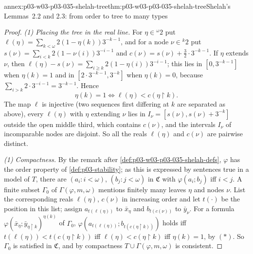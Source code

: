 \begin{annexitem}{annex:p03-w03-p03-035-shelah-tree}{thm:p03-w03-p03-035-shelah-tree}{Shelah's Lemmas~2.2 and 2.3: from order to tree to many types}
\begin{proof}
\emph{(1) Placing the tree in the real line.}  For \(\eta\in{}^{\omega}2\) put
\(\ell(\eta)=\sum_{k<\omega}2(1-\eta(k))3^{-k-1}\), and for a node
\(\nu\in{}^{k}2\) put \(s(\nu)=\sum_{i<k}2(1-\nu(i))3^{-i-1}\) and
\(c(\nu)=s(\nu)+\tfrac32\cdot3^{-k-1}\).  If \(\eta\) extends \(\nu\), then
\(\ell(\eta)-s(\nu)=\sum_{i\geq k}2(1-\eta(i))3^{-i-1}\); this lies in
\([0,3^{-k-1}]\) when \(\eta(k)=1\) and in \([2\cdot3^{-k-1},3^{-k}]\) when
\(\eta(k)=0\), because \(\sum_{i>k}2\cdot3^{-i-1}=3^{-k-1}\).  Hence
\[
  \eta(k)=1\iff\ell(\eta)<c(\eta\restriction k).\tag{\(*\)}
\]
The map \(\ell\) is injective (two sequences first differing at \(k\) are
separated as above), every \(\ell(\eta)\) with \(\eta\) extending \(\nu\) lies
in \(I_\nu=[s(\nu),s(\nu)+3^{-k}]\) outside the open middle third, which
contains \(c(\nu)\), and the intervals \(I_\nu\) of incomparable nodes are
disjoint.  So all the reals \(\ell(\eta)\) and \(c(\nu)\) are pairwise
distinct.

\emph{(1) Compactness.}  By the remark after
\cref{def:p03-w03-p03-035-shelah-defs}, \(\varphi\) has the order property of
\cref{def:p03-stability}; as this is expressed by sentences true in a model
of \(T\), there are \((a_i:i<\omega)\), \((b_j:j<\omega)\) in \(\mathfrak C\)
with \(\varphi(a_i;b_j)\) iff \(i<j\).  A finite subset \(\Gamma_0\) of
\(\Gamma(\varphi,m,\omega)\) mentions finitely many leaves \(\eta\) and nodes
\(\nu\).  List the corresponding reals \(\ell(\eta)\), \(c(\nu)\) in
increasing order and let \(t(\cdot)\) be the position in this list; assign
\(a_{t(\ell(\eta))}\) to \(\bar x_\eta\) and \(b_{t(c(\nu))}\) to
\(\bar y_\nu\).  For a formula
\(\varphi(\bar x_\eta;\bar y_{\eta\restriction k})^{\eta(k)}\) of
\(\Gamma_0\), \(\varphi(a_{t(\ell(\eta))};b_{t(c(\eta\restriction k))})\)
holds iff \(t(\ell(\eta))<t(c(\eta\restriction k))\) iff
\(\ell(\eta)<c(\eta\restriction k)\) iff \(\eta(k)=1\), by \((*)\).  So
\(\Gamma_0\) is satisfied in \(\mathfrak C\), and by compactness
\(T\cup\Gamma(\varphi,m,\omega)\) is consistent.


\end{proof}
\end{annexitem}
